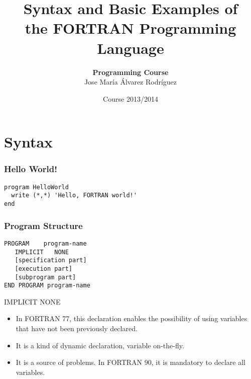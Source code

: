 \documentclass[xcolor=dvipsnames,dvip,notes=show,table]{beamer}
\title[FORTRAN]{Syntax and Basic Examples of \\ the FORTRAN Programming Language}
\author[Jose María Álvarez Rodríguez]{\textbf{Programming Course} \\ \vspace{0.3cm} Jose María Álvarez Rodríguez}
\subtitle{}
\institute{Department of Computer Science \\ Carlos III University of Madrid}
\date{Course 2013/2014}
\begin{document}
\frame{
\titlepage

}
% 
\frame{
\tableofcontents

}
% 
% 
\section{Syntax}
\begin{frame}[fragile]
\frametitle{Hello World!}

\begin{lstlisting}
program HelloWorld
  write (*,*) 'Hello, FORTRAN world!' 
end
\end{lstlisting}
\end{frame}

% 
\begin{frame}[fragile]
\frametitle{Program Structure}

\begin{lstlisting}
PROGRAM    program-name
   IMPLICIT   NONE 
   [specification part]
   [execution part]
   [subprogram part]
END PROGRAM program-name
\end{lstlisting}

\begin{alertblock}{IMPLICIT NONE}
\begin{itemize}
 \item In FORTRAN 77, this declaration enables the possibility of using variables that have not been previously declared.
 \item  It is a kind of dynamic declaration, variable on-the-fly.
 \item It is a source of problems. In FORTRAN 90, it is mandatory to declare all variables.
\end{itemize}
\end{alertblock}

\end{frame}

% 
\end{document}
